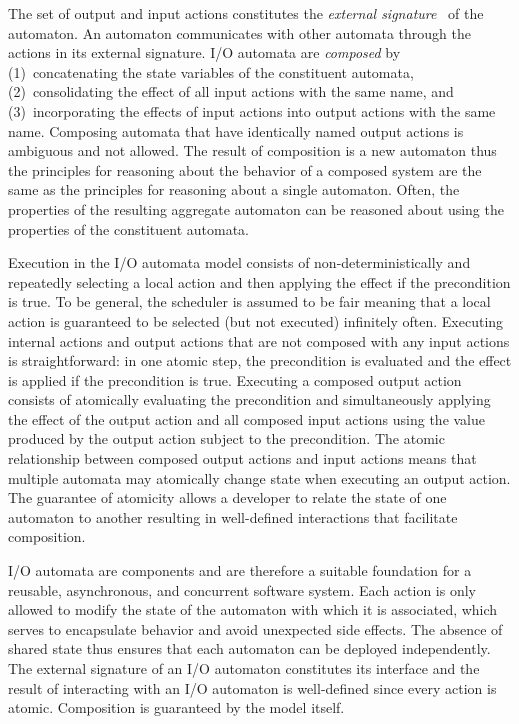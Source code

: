 The set of output and input actions constitutes the \emph{external signature}~\cite{lynch1996distributed} of the automaton.
An automaton communicates with other automata through the actions in its external signature.
I/O automata are \emph{composed} by (1)~concatenating the state variables of the constituent automata, (2)~consolidating the effect of all input actions with the same name, and (3)~incorporating the effects of input actions into output actions with the same name.
Composing automata that have identically named output actions is ambiguous and not allowed.
The result of composition is a new automaton thus the principles for reasoning about the behavior of a composed system are the same as the principles for reasoning about a single automaton.
Often, the properties of the resulting aggregate automaton can be reasoned about using the properties of the constituent automata.

Execution in the I/O automata model consists of non-deterministically and repeatedly selecting a local action and then applying the effect if the precondition is true.
To be general, the scheduler is assumed to be fair meaning that a local action is guaranteed to be selected (but not executed) infinitely often.
Executing internal actions and output actions that are not composed with any input actions is straightforward: in one atomic step, the precondition is evaluated and the effect is applied if the precondition is true.
Executing a composed output action consists of atomically evaluating the precondition and simultaneously applying the effect of the output action and all composed input actions using the value produced by the output action subject to the precondition.
The atomic relationship between composed output actions and input actions means that multiple automata may atomically change state when executing an output action.
The guarantee of atomicity allows a developer to relate the state of one automaton to another resulting in well-defined interactions that facilitate composition.

I/O automata are components and are therefore a suitable foundation for a reusable, asynchronous, and concurrent software system.
Each action is only allowed to modify the state of the automaton with which it is associated, which serves to encapsulate behavior and avoid unexpected side effects.
The absence of shared state thus ensures that each automaton can be deployed independently.
The external signature of an I/O automaton constitutes its interface and the result of interacting with an I/O automaton is well-defined since every action is atomic.
Composition is guaranteed by the model itself.

